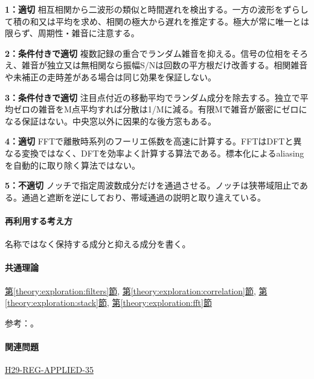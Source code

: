 \noindent\textbf{1：適切} 相互相関から二波形の類似と時間遅れを検出する。一方の波形をずらして積の和又は平均を求め、相関の極大から遅れを推定する。極大が常に唯一とは限らず、周期性・雑音に注意する。\par

\noindent\textbf{2：条件付きで適切} 複数記録の重合でランダム雑音を抑える。信号の位相をそろえ、雑音が独立又は無相関なら振幅S/Nは回数の平方根だけ改善する。相関雑音や未補正の走時差がある場合は同じ効果を保証しない。\par

\noindent\textbf{3：条件付きで適切} 注目点付近の移動平均でランダム成分を除去する。独立で平均ゼロの雑音をM点平均すれば分散は1/Mに減る。有限Mで雑音が厳密にゼロになる保証はない。中央窓以外に因果的な後方窓もある。\par

\noindent\textbf{4：適切} FFTで離散時系列のフーリエ係数を高速に計算する。FFTはDFTと異なる変換ではなく、DFTを効率よく計算する算法である。標本化によるaliasingを自動的に取り除く算法ではない。\par

\noindent\textbf{5：不適切} ノッチで指定周波数成分だけを通過させる。ノッチは狭帯域阻止である。通過と遮断を逆にしており、帯域通過の説明と取り違えている。\par

\paragraph{再利用する考え方} 名称ではなく保持する成分と抑える成分を書く。

\paragraph{共通理論} \hyperref[theory:exploration:filters]{第\ref*{theory:exploration:filters}節}, \hyperref[theory:exploration:correlation]{第\ref*{theory:exploration:correlation}節}, \hyperref[theory:exploration:stack]{第\ref*{theory:exploration:stack}節}, \hyperref[theory:exploration:fft]{第\ref*{theory:exploration:fft}節}

\par 参考：\cite{mit_signals2010,mit_moving2012,scipy_notch,scipy_fft,usgs_processing2000}。

\paragraph{関連問題} \hyperref[q:h29-reg-applied-35]{H29-REG-APPLIED-35}

